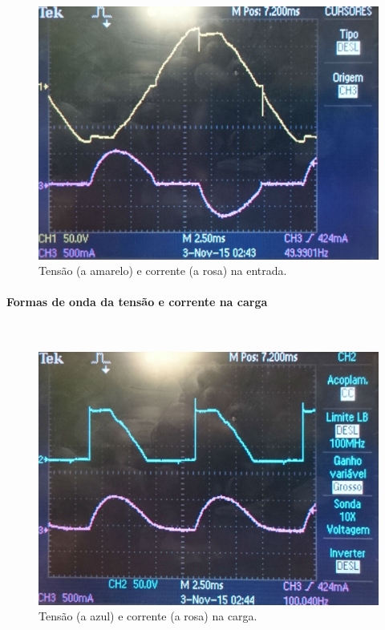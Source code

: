\documentclass[a4paper,11pt]{article}
\numberwithin{equation}{section}
\begin{document}
\begin{figure}[H]
	\centering
	\includegraphics[keepaspectratio=true, scale=0.12]{img/DSC_0190}
	\caption{Tensão (a amarelo) e corrente (a rosa) na entrada.}
	\label{fig:tcentradasemi}
	\vspace{-0.8em}
\end{figure}

\paragraph{Formas de onda da tensão e corrente na carga} \mbox{}\

\begin{figure}[H]
	\centering
	\includegraphics[keepaspectratio=true, scale=0.13]{img/DSC_0191}
	\caption{Tensão (a azul) e corrente (a rosa) na carga.}
	\label{fig:tccargasemi}
	\vspace{-0.8em}
\end{figure}
\end{document}
